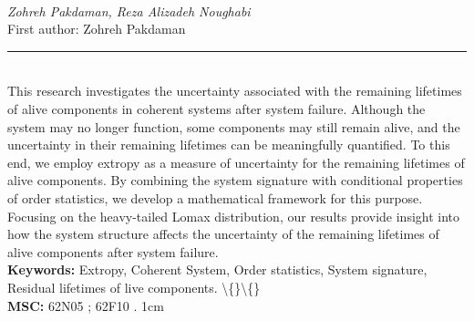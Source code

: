 \documentclass[10pt,twoside]{article}
\begin{document}
\noindent\begin{minipage}[t][\textheight]{\textwidth}
\\[0.35em]
{\itshape Zohreh Pakdaman, Reza Alizadeh Noughabi}\\[0.2em]
{\footnotesize First author: Zohreh Pakdaman}\\[0.45em]
\noindent\rule{\textwidth}{0.3pt}\\[0.4em]
{\footnotesize  This research investigates the uncertainty associated with the remaining lifetimes of alive components in coherent systems after system failure. Although the system may no longer function, some components may still remain alive, and the uncertainty in their remaining lifetimes can be meaningfully quantified. To this end, we employ extropy as a measure of uncertainty for the remaining lifetimes of alive components. By combining the system signature with conditional properties of order statistics, we develop a mathematical framework for this purpose. Focusing on the heavy-tailed Lomax distribution, our results provide insight into how the system structure affects the uncertainty of the remaining lifetimes of alive components after system failure.}\\[0.4em]
{\footnotesize\bfseries Keywords:} {\footnotesize Extropy, Coherent System, Order statistics, System signature, Residual lifetimes of live components. \textbackslash\{\}\textbackslash\{\}}\\[0.15em]
{\footnotesize\bfseries MSC:} {\footnotesize 62N05 ; 62F10 . 1cm}\\
\vfill
\end{minipage}
\newpage
\end{document}
